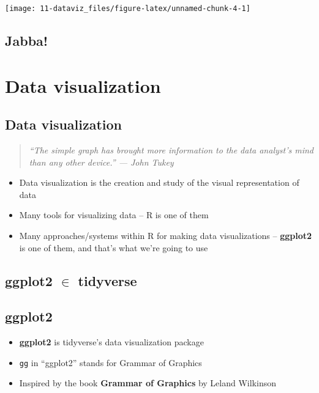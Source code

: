 \documentclass[
]{book}
\providecommand{\tightlist}{%
  \setlength{\itemsep}{0pt}\setlength{\parskip}{0pt}}
\theoremstyle{definition}
\theoremstyle{definition}
\theoremstyle{definition}
\theoremstyle{definition}
\theoremstyle{remark}
\begin{document}
\begin{center}\texttt{[image: 11-dataviz\_files/figure-latex/unnamed-chunk-4-1]} \end{center}

\hypertarget{jabba-1}{%
\section{Jabba!}\label{jabba-1}}

\hypertarget{data-visualization-2}{%
\chapter{Data visualization}\label{data-visualization-2}}

\hypertarget{data-visualization-3}{%
\section{Data visualization}\label{data-visualization-3}}

\begin{quote}
\emph{``The simple graph has brought more information to the data analyst's mind than any other device.'' --- John Tukey}
\end{quote}

\begin{itemize}
\tightlist
\item
  Data visualization is the creation and study of the visual representation of data
\item
  Many tools for visualizing data -- R is one of them
\item
  Many approaches/systems within R for making data visualizations -- \textbf{ggplot2} is one of them, and that's what we're going to use
\end{itemize}

\hypertarget{ggplot2-in-tidyverse-1}{%
\section{\texorpdfstring{ggplot2 \(\in\) tidyverse}{ggplot2 \textbackslash in tidyverse}}\label{ggplot2-in-tidyverse-1}}

\hypertarget{ggplot2-1}{%
\section{ggplot2}\label{ggplot2-1}}

\begin{itemize}
\tightlist
\item
  \textbf{ggplot2} is tidyverse's data visualization package
\item
  \texttt{gg} in ``ggplot2'' stands for Grammar of Graphics
\item
  Inspired by the book \textbf{Grammar of Graphics} by Leland Wilkinson
\end{itemize}
\end{document}
